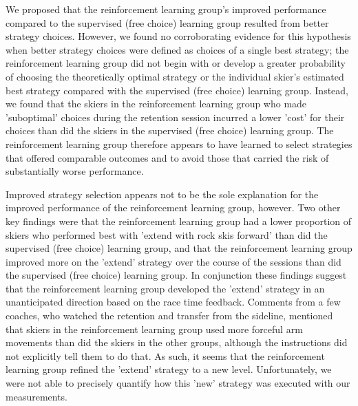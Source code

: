 \documentclass[pdflatex,sn-nature]{sn-jnl}%
\theoremstyle{thmstyleone}%
\theoremstyle{thmstyletwo}%
\theoremstyle{thmstylethree}%
\begin{document}
We proposed that the reinforcement learning group's improved performance compared to the supervised (free choice) learning group resulted from better strategy choices. However, we found no corroborating evidence for this hypothesis when better strategy choices were defined as choices of a single best strategy; the reinforcement learning group did not begin with or develop a greater probability of choosing the theoretically optimal strategy or the individual skier's estimated best strategy compared with the supervised (free choice) learning group. Instead, we found that the skiers in the reinforcement learning group who made 'suboptimal' choices during the retention session incurred a lower 'cost' for their choices than did the skiers in the supervised (free choice) learning group. The reinforcement learning group therefore appears to have learned to select strategies that offered comparable outcomes and to avoid those that carried the risk of substantially worse performance.

Improved strategy selection appears not to be the sole explanation for the improved performance of the reinforcement learning group, however. Two other key findings were that the reinforcement learning group had a lower proportion of skiers who performed best with 'extend with rock skis forward' than did the supervised (free choice) learning group, and that the reinforcement learning group improved more on the 'extend' strategy over the course of the sessions than did the supervised (free choice) learning group. In conjunction these findings suggest that the reinforcement learning group developed the 'extend' strategy in an unanticipated direction based on the race time feedback. Comments from a few coaches, who watched the retention and transfer from the sideline, mentioned that skiers in the reinforcement learning group used more forceful arm movements than did the skiers in the other groups, although the instructions did not explicitly tell them to do that. As such, it seems that the reinforcement learning group refined the 'extend' strategy to a new level. Unfortunately, we were not able to precisely quantify how this 'new' strategy was executed with our measurements.
\end{document}

